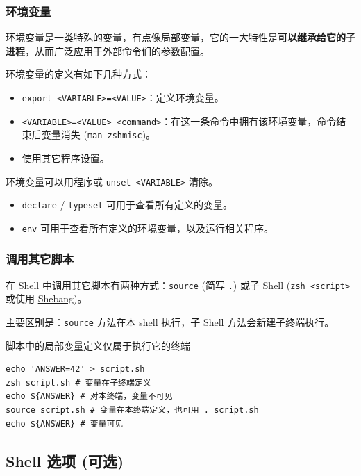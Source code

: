 \documentclass{article}
\begin{document}
	\subsubsection{环境变量}

	环境变量是一类特殊的变量，有点像局部变量，它的一大特性是\textbf{可以继承给它的子进程}，从而广泛应用于外部命令们的参数配置。

	环境变量的定义有如下几种方式：
	\begin{itemize}
		\itemsep0pt
		\item \texttt{export <VARIABLE>=<VALUE>}：定义环境变量。
		\item \texttt{<VARIABLE>=<VALUE> <command>}：在这一条命令中拥有该环境变量，命令结束后变量消失 (\texttt{man zshmisc})。
		\item 使用其它程序设置。
	\end{itemize}

	环境变量可以用程序或 \texttt{unset <VARIABLE>} 清除。

	\begin{itemize}
		\itemsep0pt
		\item \texttt{declare} / \texttt{typeset} 可用于查看所有定义的变量。
		\item \texttt{env} 可用于查看所有定义的环境变量，以及运行相关程序。
	\end{itemize}

	\subsubsection[调用其它脚本]{调用其它脚本\protect\cite{lbwvssl}}

	在 Shell 中调用其它脚本有两种方式：\texttt{source} (简写 \texttt .) 或子 Shell (\texttt{zsh <script>} 或使用 \href{https://en.wikipedia.org/wiki/Shebang_(Unix)}{Shebang})。

	主要区别是：\texttt{source} 方法在本 shell 执行，子 Shell 方法会新建子终端执行。

	脚本中的局部变量定义仅属于执行它的终端

	\begin{verbatim}
echo 'ANSWER=42' > script.sh
zsh script.sh # 变量在子终端定义
echo ${ANSWER} # 对本终端，变量不可见
source script.sh # 变量在本终端定义，也可用 . script.sh
echo ${ANSWER} # 变量可见
	\end{verbatim}

	\subsection{Shell 选项 (可选)}
\end{document}
